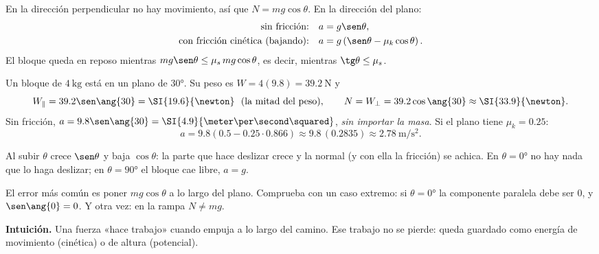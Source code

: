\documentclass[11pt,a4paper]{article}
\begin{document}
\begin{propiedad}
En la dirección perpendicular no hay movimiento, así que $N=mg\cos\theta$. En la dirección del plano:
\begin{align*}
\text{sin fricción:}&\quad a=g\sen\theta,\\
\text{con fricción cinética (bajando):}&\quad a=g\left(\sen\theta-\mu_k\cos\theta\right).
\end{align*}
El bloque queda en reposo mientras $mg\sen\theta\le\mu_s\,mg\cos\theta$, es decir, mientras $\tg\theta\le\mu_s$.
\end{propiedad}

\begin{ejemplo}
Un bloque de $\SI{4}{\kilo\gram}$ está en un plano de \ang{30}. Su peso es $W=4(9.8)=\SI{39.2}{\newton}$ y
\[ W_{\parallel}=39.2\sen\ang{30}=\SI{19.6}{\newton}\ \ (\text{la mitad del peso}),\qquad
   N=W_{\perp}=39.2\cos\ang{30}\approx\SI{33.9}{\newton}. \]
Sin fricción, $a=9.8\sen\ang{30}=\SI{4.9}{\meter\per\second\squared}$, \emph{sin importar la masa}.
Si el plano tiene $\mu_k=0.25$:
\[ a=9.8\left(0.5-0.25\cdot0.866\right)\approx9.8\,(0.2835)\approx\SI{2.78}{\meter\per\second\squared}. \]
\end{ejemplo}
\begin{propiedad}
Al subir $\theta$ crece $\sen\theta$ y baja $\cos\theta$: la parte que hace deslizar crece y la normal (y con ella la
fricción) se achica. En $\theta=\ang{0}$ no hay nada que lo haga deslizar; en $\theta=\ang{90}$ el bloque cae libre, $a=g$.
\end{propiedad}
\begin{ojo}
El error más común es poner $mg\cos\theta$ a lo largo del plano. Comprueba con un caso extremo: si $\theta=\ang{0}$ la
componente paralela debe ser $0$, y $\sen\ang{0}=0$. Y otra vez: en la rampa $N\neq mg$.
\end{ojo}


\textbf{Intuición.} Una fuerza «hace trabajo» cuando empuja a lo largo del camino. Ese trabajo no se pierde: queda
guardado como energía de movimiento (cinética) o de altura (potencial).
\end{document}

